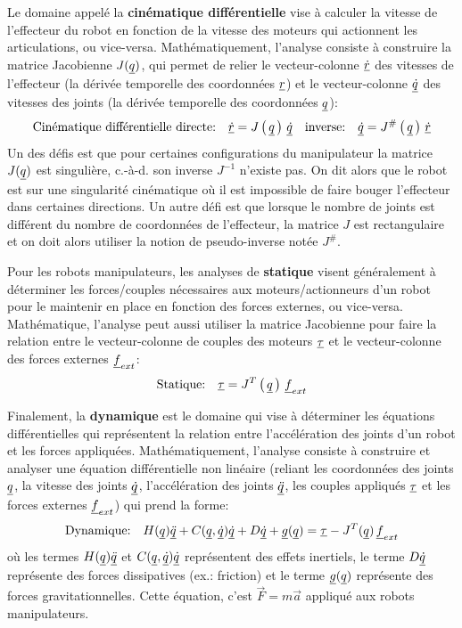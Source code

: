 Le domaine appelé la \textbf{cinématique différentielle} vise à calculer la vitesse de l'effecteur du robot en fonction de la vitesse des moteurs qui actionnent les articulations, ou vice-versa. Mathématiquement, l'analyse consiste à construire la matrice Jacobienne $J(\underline{q})$, qui permet de relier le vecteur-colonne $\underline{\dot{r}}$ des vitesses de l'effecteur (la dérivée temporelle des coordonnées $\underline{r}$) et le vecteur-colonne $\underline{\dot{q}}$ des vitesses des joints (la dérivée temporelle des coordonnées $\underline{q}$):
\begin{equation}
	\text{Cinématique différentielle directe:} \quad \underline{\dot{r}} = J\left( \, \underline{q} \, \right) \, \underline{\dot{q}}   \quad \text{inverse:} \quad \underline{\dot{q}} = J^{\#}\left( \, \underline{q} \, \right) \, \underline{\dot{r}}
\end{equation}
Un des défis est que pour certaines configurations du manipulateur la matrice $J(\underline{q})$ est singulière, c.-à-d. son inverse $J^{-1}$ n'existe pas. On dit alors que le robot est sur une singularité cinématique où il est impossible de faire bouger l'effecteur dans certaines directions. Un autre défi est que lorsque le nombre de joints est différent du nombre de coordonnées de l'effecteur, la matrice $J$ est rectangulaire et on doit alors utiliser la notion de pseudo-inverse notée $J^{\#}$.

Pour les robots manipulateurs, les analyses de \textbf{statique} visent généralement à déterminer les forces/couples nécessaires aux moteurs/actionneurs d'un robot pour le maintenir en place en fonction des forces externes, ou vice-versa. Mathématique, l'analyse peut aussi utiliser la matrice Jacobienne pour faire la relation entre le vecteur-colonne de couples des moteurs $\underline{\tau}$ et le vecteur-colonne des forces externes $\underline{f}_{ext}$:
\begin{equation}
	\text{Statique:} \quad \underline{\tau} = J^T\left( \, \underline{q} \, \right) \, \underline{f}_{ext}
\end{equation}

Finalement, la \textbf{dynamique} est le domaine qui vise à déterminer les équations différentielles qui représentent la relation entre l'accélération des joints d'un robot et les forces appliquées. Mathématiquement, l'analyse consiste à construire et analyser une équation différentielle non linéaire (reliant les coordonnées des joints $\underline{q}$, la vitesse des joints $\underline{\dot{q}}$, l'accélération des joints $\underline{\ddot{q}}$, les couples appliqués $\underline{\tau}$ et les forces externes $\underline{f}_{ext}$) qui prend la forme:
\begin{align}
	\text{Dynamique:} \quad H(\underline{q}) \underline{\ddot{q}} + C(\underline{q},\underline{\dot{q}}) \underline{\dot{q}} + D \underline{\dot{q}} + \underline{g}(\underline{q}) = \underline{\tau} - J^T(\underline{q}) \, \underline{f}_{ext}
	\label{eq:manipulator}
\end{align}
où les termes $H(\underline{q}) \underline{\ddot{q}}$ et $C(\underline{q},\underline{\dot{q}}) \underline{\dot{q}}$ représentent des effets inertiels, le terme $D \underline{\dot{q}}$ représente des forces dissipatives (ex.: friction) et le terme $\underline{g}(\underline{q})$ représente des forces gravitationnelles. Cette équation, c'est $\vec{F}=m\vec{a}$ appliqué aux robots manipulateurs.


